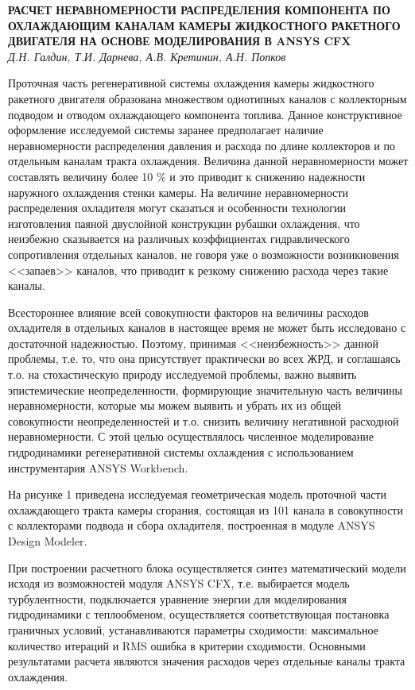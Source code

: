 \begin{center}{ \bf  РАСЧЕТ НЕРАВНОМЕРНОСТИ РАСПРЕДЕЛЕНИЯ КОМПОНЕНТА ПО ОХЛАЖДАЮЩИМ КАНАЛАМ КАМЕРЫ ЖИДКОСТНОГО РАКЕТНОГО ДВИГАТЕЛЯ НА ОСНОВЕ МОДЕЛИРОВАНИЯ В ANSYS CFX}\\
{\it Д.Н. Галдин, Т.И. Дарнева, А.В. Кретинин, А.Н. Попков} \\
\end{center}

Проточная часть регенеративной системы охлаждения камеры жидкостного ракетного двигателя
образована множеством однотипных каналов с коллекторным подводом и отводом охлаждающего компонента топлива.
Данное конструктивное оформление исследуемой системы заранее предполагает
наличие неравномерности распределения давления и расхода по длине коллекторов и по отдельным каналам тракта охлаждения.
Величина данной неравномерности может составлять величину более 10 $\%$
и это приводит к снижению надежности наружного охлаждения стенки камеры.
На величине неравномерности распределения охладителя могут сказаться
и особенности технологии изготовления паяной двуслойной конструкции рубашки охлаждения,
что неизбежно сказывается на различных коэффициентах гидравлического сопротивления отдельных каналов,
не говоря уже о возможности возникновения <<запаев>> каналов, что приводит к резкому снижению расхода через такие каналы.

Всестороннее влияние всей совокупности факторов на величины расходов охладителя в отдельных каналов
в настоящее время не может быть исследовано с достаточной надежностью.
Поэтому, принимая <<неизбежность>> данной проблемы, т.е. то, что она присутствует практически во всех ЖРД,
и соглашаясь т.о. на стохастическую природу исследуемой проблемы, важно выявить эпистемические неопределенности,
формирующие значительную часть величины неравномерности,
которые мы можем выявить и убрать их из общей совокупности неопределенностей
и т.о. снизить величину негативной расходной неравномерности.
С этой целью осуществлялось численное моделирование гидродинамики регенеративной системы охлаждения с использованием инструментария ANSYS Workbench.

На рисунке 1 приведена исследуемая геометрическая модель проточной части охлаждающего тракта камеры сгорания,
состоящая из 101 канала в совокупности с коллекторами подвода и сбора охладителя,
построенная в модуле ANSYS Design Modeler.

При построении расчетного блока осуществляется синтез математический модели исходя из возможностей модуля ANSYS CFX, т.е. выбирается модель турбулентности, подключается уравнение энергии для моделирования гидродинамики с теплообменом, осуществляется соответствующая постановка граничных условий, устанавливаются параметры сходимости: максимальное количество итераций и RMS ошибка в критерии сходимости. Основными результатами расчета являются значения расходов через отдельные каналы тракта охлаждения.

